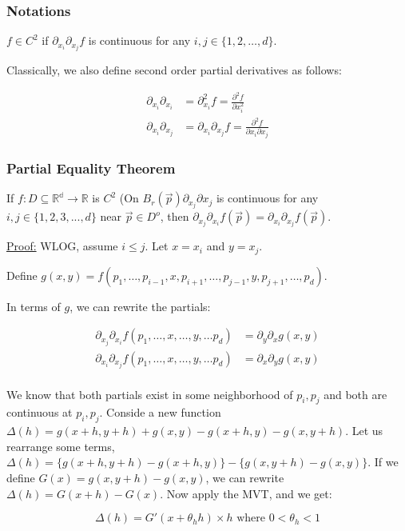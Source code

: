 \documentclass[11 pt, twoside]{article}
\begin{document}
\subsubsection{Notations}
$f \in C^2$ if $\partial_{x_i}\partial_{x_j} f$ is continuous for any $i, j \in
\{1, 2, \dots, d\}$.

Classically, we also define second order partial derivatives as follows:

\begin{align*}
\partial_{x_i} \partial_{x_i} &= \partial_{x_i}^2 f = \frac{\partial^2 f}
{\partial x_i^2}\\
\partial_{x_i} \partial_{x_j} &= \partial_{x_i} \partial_{x_j} f =
\frac{\partial^2 f}{\partial x_i \partial x_j}
\end{align*}

\subsubsection{Partial Equality Theorem}
If $f:D \subseteq \mathbb{R^d} \to \mathbb{R}$ is $C^2$ (On $B_r(\vec{p}) \partial_{x_j}\partial{x_j}$ is continuous for any $i, j \in \{1, 2, 3, ..., d\}$ near $\vec{p} \in D^o$, then $\partial_{x_j}\partial_{x_i} f(\vec{p}) = \partial_{x_i}\partial_{x_j} f(\vec{p})$.

\underline{Proof:}
WLOG, assume $i \leq j$. Let $x = x_i$ and $y = x_j$.

Define $g(x, y) = f(p_1,
\dots, p_{i-1}, x, p_{i+1}, \dots, p_{j-1}, y, p_{j+1}, \dots, p_d)$.

In terms of $g$, we
can rewrite the partials:

\begin{align*}
\partial_{x_j}\partial_{x_i} f(p_1, \dots, x, \dots, y, \dots p_d) &= \partial_y
\partial_x g(x, y)\\
\partial_{x_i}\partial_{x_j} f(p_1, \dots, x, \dots, y, \dots p_d) &= \partial_x
\partial_y g(x, y)\\
\end{align*}

We know that both partials exist in some neighborhood of $p_i, p_j$ and both are
continuous at $p_i, p_j$.
Conside a
new function $\Delta(h) = g(x + h, y + h) + g(x, y) - g(x + h, y) - g(x, y +
h)$. Let us rearrange some terms, $\Delta(h) = \{g(x + h,
y + h) - g(x + h, y)\} - \{g(x, y + h) - g(x, y)\}$. If we define $G(x) = g(x,
y+h) - g(x, y)$, we can rewrite $\Delta(h) = G(x+h) - G(x)$. Now apply the MVT, and we get:

$$\Delta(h) = G'(x + \theta_h h) \times h \text{        where } 0 < \theta_h < 1$$
\end{document}

